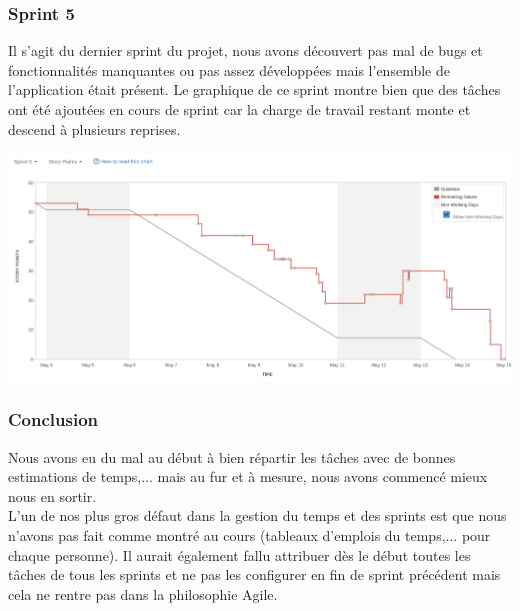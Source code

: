 \documentclass[t, 12pt, usenames,dvipsnames]{article}
\begin{document}
        
            \subsubsection{Sprint 5}
                \noindent Il s'agit du dernier sprint du projet, nous avons découvert pas mal de bugs et fonctionnalités manquantes ou pas assez développées mais l'ensemble de l'application était présent. Le graphique de ce sprint montre bien que des tâches ont été ajoutées en cours de sprint car la charge de travail restant monte et descend à plusieurs reprises. 
                
                \begin{center}
                    \includegraphics[scale=.25]{images/graph-new/sprint5.png}
                    \label{fig:sprint5_graph}
                \end{center}
                
                
           \subsubsection{Conclusion} 
               \noindent Nous avons eu du mal au début à bien répartir les tâches avec de bonnes estimations de temps,... mais au fur et à mesure, nous avons commencé mieux nous en sortir. \\
                L'un de nos plus gros défaut dans la gestion du temps et des sprints est que nous n'avons pas fait comme montré au cours (tableaux d'emplois du temps,... pour chaque personne). Il aurait également fallu attribuer dès le début toutes les tâches de tous les sprints et ne pas les configurer en fin de sprint précédent mais cela ne rentre pas dans la philosophie Agile. 
                
        
\end{document}
